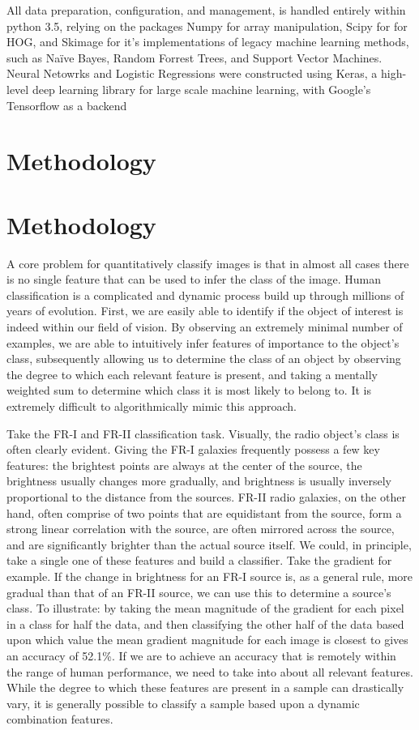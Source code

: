 \documentclass[%
 aip,
 jmp,%
 amsmath,amssymb,
 reprint,%
]{revtex4-1}
\begin{document}
All data preparation, configuration, and management, is handled entirely within python 3.5, relying on the packages Numpy for array manipulation, Scipy for for HOG, and Skimage for it's implementations of legacy machine learning methods, such as Naïve Bayes, Random Forrest Trees, and Support Vector Machines. Neural Netowrks and Logistic Regressions were constructed using Keras, a high-level deep learning library for large scale machine learning, with Google's Tensorflow as a backend  

\section{Methodology} 

\section{Methodology} 

A core problem for quantitatively classify images is that in almost all cases there is no single feature that can be used to infer the class of the image. Human classification is a complicated and dynamic process build up through millions of years of evolution. First, we are easily able to identify if the object of interest is indeed within our field of vision. By observing an extremely minimal number of examples, we are able to intuitively infer features of importance to the object's class, subsequently allowing us to determine the class of an object by observing the degree to which each relevant feature is present, and taking a mentally weighted sum to determine which class it is most likely to belong to. It is extremely difficult to algorithmically mimic this approach.

Take the FR-I and FR-II classification task. Visually, the radio object's class is often clearly evident. Giving the FR-I galaxies frequently possess a few key features: the brightest points are always at the center of the source, the brightness usually changes more gradually, and brightness is usually inversely proportional to the distance from the sources.  FR-II radio galaxies, on the other hand, often comprise of two points that are equidistant from the source, form a strong linear correlation with the source, are often mirrored across the source, and are significantly brighter than the actual source itself. We could, in principle, take a single one of these features and build a classifier. Take the gradient for example. If the change in brightness for an FR-I source is, as a general rule, more gradual than that of an FR-II source, we can use this to determine a source's class. To illustrate: by taking the mean magnitude of the gradient for each pixel in a class for half the data, and then classifying the other half of the data based upon which value the mean gradient magnitude for each image is closest to gives an accuracy of 52.1\%. If we are to achieve an accuracy that is remotely within the range of human performance, we need to take into about all relevant features. While the degree to which these features are present in a sample can drastically vary, it is generally possible to classify a sample based upon a dynamic combination features. 
\end{document}
